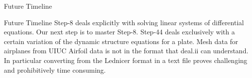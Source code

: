 \documentclass{beamer}
\begin{document}
\begin{section}{Future Timeline}
\begin{frame}{Future Timeline}
    Step-8 deals explicitly with solving linear systems of differential equations. Our next step is to master Step-8. 
    \newline
    \newline
    Step-44 deals exclusively with a certain variation of the dynamic structure equations for a plate. 
    \newline
    \newline
    Mesh data for airplanes from UIUC Airfoil data is not in the format that deal.ii can understand. In particular converting from the Lednicer format in a text file proves challenging and prohibitively time consuming. 
\end{frame}
\end{section}
\end{document}
